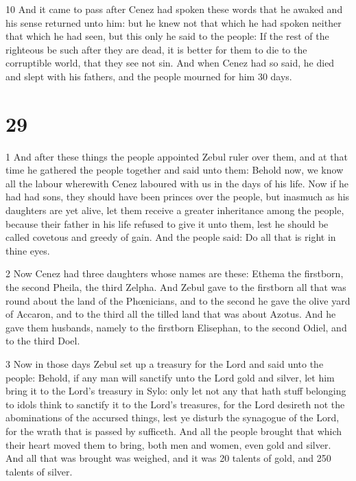 \par 10 And it came to pass after Cenez had spoken these words that he awaked and his sense returned unto him: but he knew not that which he had spoken neither that which he had seen, but this only he said to the people: If the rest of the righteous be such after they are dead, it is better for them to die to the corruptible world, that they see not sin. And when Cenez had so said, he died and slept with his fathers, and the people mourned for him 30 days.



\chapter{29}

\par 1 And after these things the people appointed Zebul ruler over them, and at that time he gathered the people together and said unto them: Behold now, we know all the labour wherewith Cenez laboured with us in the days of his life. Now if he had had sons, they should have been princes over the people, but inasmuch as his daughters are yet alive, let them receive a greater inheritance among the people, because their father in his life refused to give it unto them, lest he should be called covetous and greedy of gain. And the people said: Do all that is right in thine eyes. 

\par 2 Now Cenez had three daughters whose names are these: Ethema the firstborn, the second Pheila, the third Zelpha. And Zebul gave to the firstborn all that was round about the land of the Phœnicians, and to the second he gave the olive yard of Accaron, and to the third all the tilled land that was about Azotus. And he gave them husbands, namely to the firstborn Elisephan, to the second Odiel, and to the third Doel. 

\par 3 Now in those days Zebul set up a treasury for the Lord and said unto the people: Behold, if any man will sanctify unto the Lord gold and silver, let him bring it to the Lord's treasury in Sylo: only let not any that hath stuff belonging to idols think to sanctify it to the Lord's treasures, for the Lord desireth not the abominations of the accursed things, lest ye disturb the synagogue of the Lord, for the wrath that is passed by sufficeth. And all the people brought that which their heart moved them to bring, both men and women, even gold and silver. And all that was brought was weighed, and it was 20 talents of gold, and 250 talents of silver. 

